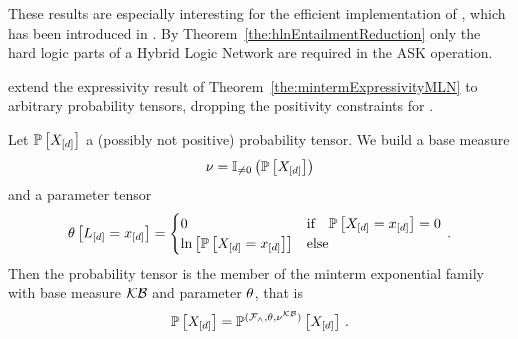 These results are especially interesting for the efficient implementation of , which has been introduced in .
By Theorem~\ref{the:hlnEntailmentReduction} only the hard logic parts of a Hybrid Logic Network are required in the ASK operation.


\HybridLogicNetworks{} extend the expressivity result of Theorem~\ref{the:mintermExpressivityMLN} to arbitrary probability tensors, dropping the positivity constraints for \MarkovLogicNetworks{}.

\begin{theorem}
    \label{the:mintermExpressivityHLN}
    Let $\mathbb{P}\left[X_{[d]}\right]$ a (possibly not positive) probability tensor.
    We build a base measure
    \[ \nu = \mathbb{I}_{\neq0}\left(\mathbb{P}\left[X_{[d]}\right]\right) \]
    and a parameter tensor
    \begin{align*}
        \theta\left[L_{[d]}=x_{[d]}\right]
        = \begin{cases}
              0 & \text{if} \quad \mathbb{P}\left[X_{[d]}=x_{[d]}\right] = 0  \\
              \ln \left[ \mathbb{P}\left[X_{[d]}=x_{[d]}\right] \right] & \text{else}
        \end{cases} \, .
    \end{align*}
    Then the probability tensor is the member of the minterm exponential family with base measure $\mathcal{KB}$ and parameter $\theta$, that is
    \[ \mathbb{P}\left[X_{[d]}\right] = \mathbb{P}^{(\mathcal{F}_{\land},\theta,\nu^{\mathcal{KB}})}\left[X_{[d]}\right] \, . \]
\end{theorem}
